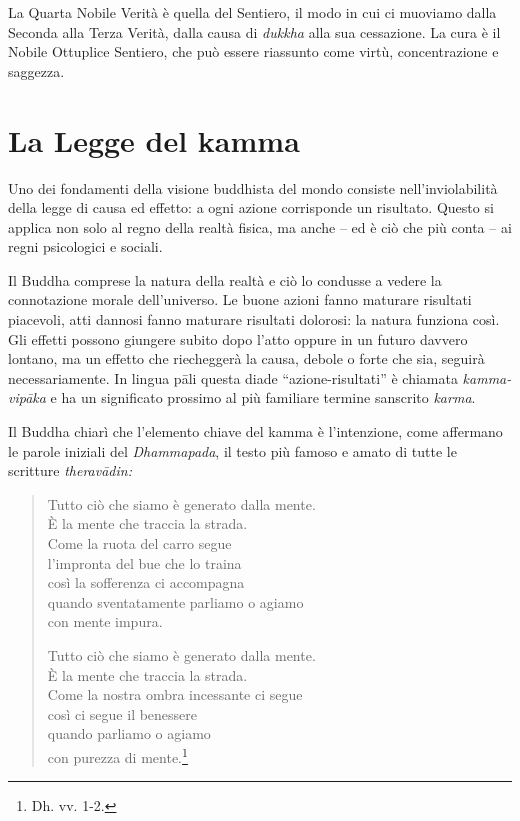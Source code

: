 La Quarta Nobile Verità è quella del Sentiero, il modo in cui ci
muoviamo dalla Seconda alla Terza Verità, dalla causa di \emph{dukkha}
alla sua cessazione. La cura è il Nobile Ottuplice Sentiero, che può
essere riassunto come virtù, concentrazione e saggezza.

\section{La Legge del kamma}

Uno dei fondamenti della visione buddhista del mondo consiste
nell'inviolabilità della legge di causa ed effetto: a ogni azione
corrisponde un risultato. Questo si applica non solo al regno della
realtà fisica, ma anche -- ed è ciò che più conta -- ai regni
psicologici e sociali.

Il Buddha comprese la natura della realtà e ciò lo condusse a vedere la
connotazione morale dell'universo. Le buone azioni fanno maturare
risultati piacevoli, atti dannosi fanno maturare risultati dolorosi: la
natura funziona così. Gli effetti possono giungere subito dopo l'atto
oppure in un futuro davvero lontano, ma un effetto che riecheggerà la
causa, debole o forte che sia, seguirà necessariamente. In lingua pāli
questa diade ``azione-risultati'' è chiamata \emph{kamma-vipāka} e ha un
significato prossimo al più familiare termine sanscrito \emph{karma}.

Il Buddha chiarì che l'elemento chiave del kamma è l'intenzione,
come affermano le parole iniziali del \emph{Dhammapada}, il testo più
famoso e amato di tutte le scritture \emph{theravādin:}

\begin{quote}

Tutto ciò che siamo è generato dalla mente.\\
È la mente che traccia la strada.\\
Come la ruota del carro segue\\
l'impronta del bue che lo traina\\
così la sofferenza ci accompagna\\
quando sventatamente parliamo o agiamo\\
con mente impura.

Tutto ciò che siamo è generato dalla mente.\\
È la mente che traccia la strada.\\
Come la nostra ombra incessante ci segue\\
così ci segue il benessere\\
quando parliamo o agiamo\\
con purezza di mente.\footnote{Dh. vv. 1-2.}

\end{quote}

